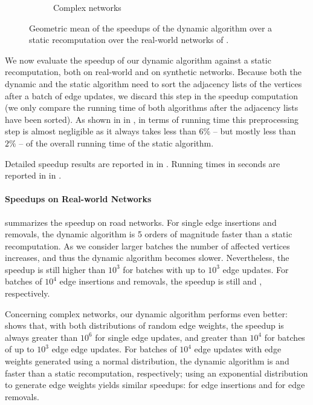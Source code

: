 \begin{figure}[t]
\begin{subfigure}[b]{.5\textwidth}
\begin{subfigure}[b]{.5\textwidth}
\end{subfigure}
\caption{Complex networks}
\label{fig:dyn-mwm:speedup-cplx}
\end{subfigure}
\caption{Geometric mean of the speedups of the dynamic algorithm over a static
recomputation over the real-world networks of
.}
\label{fig:dyn-mwm:speedup-real-world}
\end{figure}


We now evaluate the speedup of our
dynamic \suitor algorithm against a static recomputation, both on real-world and on
synthetic networks. Because both the dynamic and the static algorithm need to
sort the adjacency lists of the vertices after a batch of edge updates, we
discard this step in the speedup computation (\ie we only compare the running
time of both algorithms after the adjacency lists have been sorted).
As shown in  in ,
in terms of running time this preprocessing step is almost negligible as it always takes
less than $6\%$ -- but mostly less than $2\%$ -- of the overall running time of
the static \suitor algorithm.

Detailed speedup results are reported in
in .
Running times in seconds are reported in
in .

\paragraph{Speedups on Real-world Networks}
%

 summarizes the speedup on road networks. For
single edge insertions and removals, the dynamic algorithm is 5 orders of
magnitude faster than a static recomputation. As we consider larger batches the
number of affected vertices increases, and thus the dynamic algorithm becomes
slower. Nevertheless, the speedup is still higher than $10^3$ for batches with
up to $10^3$ edge updates. For batches of $10^4$ edge insertions
and removals, the speedup is still \speedupRoadInsBTenThou and
\speedupRoadRemBTenThou, respectively.

Concerning complex networks, our dynamic algorithm performs even better:
 shows that, with both distributions of random edge weights,
the speedup is always greater than $10^6$ for single edge updates, and
greater than $10^4$ for batches of up to $10^3$ edge edge updates.
For batches of $10^4$ edge updates with edge weights generated using a normal
distribution, the dynamic algorithm is \speedupCplxInsBTenThouNorm
and \speedupCplxRemBTenThouNorm faster than a static recomputation, respectively; using an
exponential distribution to generate edge weights yields similar speedups:
\speedupCplxInsBTenThouExp for edge insertions and \speedupCplxRemBTenThouExp
for edge removals.

